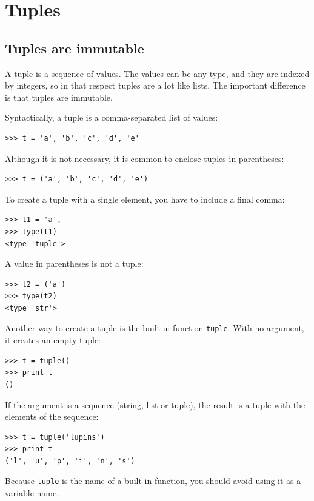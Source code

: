\documentclass[10pt]{book}
\begin{document}
\chapter{Tuples}
\label{tuplechap}

\section{Tuples are immutable}

A tuple is a sequence of values.  The values can be any type, and
they are indexed by integers, so in that respect tuples are a lot
like lists.  The important difference is that tuples are immutable.

Syntactically, a tuple is a comma-separated list of values:

\begin{verbatim}
>>> t = 'a', 'b', 'c', 'd', 'e'
\end{verbatim}
%
Although it is not necessary, it is common to enclose tuples in
parentheses:

\begin{verbatim}
>>> t = ('a', 'b', 'c', 'd', 'e')
\end{verbatim}
%
To create a tuple with a single element, you have to include a final
comma:

\begin{verbatim}
>>> t1 = 'a',
>>> type(t1)
<type 'tuple'>
\end{verbatim}
%
A value in parentheses is not a tuple:

\begin{verbatim}
>>> t2 = ('a')
>>> type(t2)
<type 'str'>
\end{verbatim}
%
Another way to create a tuple is the built-in function {\tt tuple}.
With no argument, it creates an empty tuple:

\begin{verbatim}
>>> t = tuple()
>>> print t
()
\end{verbatim}
%
If the argument is a sequence (string, list or tuple), the result
is a tuple with the elements of the sequence:

\begin{verbatim}
>>> t = tuple('lupins')
>>> print t
('l', 'u', 'p', 'i', 'n', 's')
\end{verbatim}
%
Because {\tt tuple} is the name of a built-in function, you should
avoid using it as a variable name.
\end{document}
